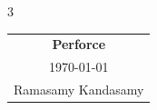 



\raggedright
\footnotesize
\raggedcolumns
\begin{multicols*}{3}
\setlength{\premulticols}{1pt}
\setlength{\postmulticols}{1pt}
\setlength{\multicolsep}{1pt}
\setlength{\columnsep}{2pt}


\begin{center}
\begin{tabular}{c}
\Large{\textbf{Perforce}}\\
\today\\
Ramasamy Kandasamy\\
\end{tabular}
\end{center}



\vfill\null
\columnbreak



\vfill\null
\columnbreak



\end{multicols*}



